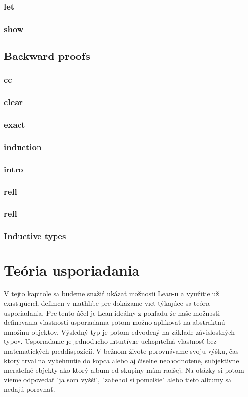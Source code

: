 \documentclass[a4paper,10pt,oneside]{report}%
\begin{document}
    \subsubsection{let}
    \subsubsection{show}
\subsection{Backward proofs}
    \subsubsection{cc}
    \subsubsection{clear}
    \subsubsection{exact}
    \subsubsection{induction}
    \subsubsection{intro}
    \subsubsection{refl}
    \subsubsection{refl}
\subsubsection{Inductive types}

\section{Teória usporiadania}
    V tejto kapitole sa budeme snažiť ukázať možnosti Lean-u a využitie už existujúcich
definícii v mathlibe pre dokázanie viet týkajúce sa teórie usporiadania.
    Pre tento účel je Lean ideálny z pohľadu že naše možnosti definovania vlastností
usporiadania potom možno aplikovať na abstraktnú množinu objektov.
    Výsledný typ je potom odvodený na základe závislostných typov.
    Usporiadanie je jednoducho intuitívne uchopiteľná vlastnosť bez matematických
preddispozícií.
    V bežnom živote porovnávame svoju výšku, čas ktorý trval na vybehnutie do kopca
alebo aj číselne neohodnotené, subjektívne merateľné objekty ako ktorý album
od skupiny mám radšej.
    Na otázky si potom vieme odpovedať "ja som vyšší", "zabehol si pomalšie" alebo
tieto albumy sa nedajú porovnať.
\end{document}
